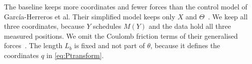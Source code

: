 The baseline keeps more coordinates and fewer forces than the control model
of Garc\'ia-Herreros et al.
Their simplified model keeps only $X$ and
$\Theta$~\cite[Eq.~(11)]{garcia2013model}.
We keep all three coordinates, because $Y$ schedules $M(Y)$ and the data
hold all three measured positions.
We omit the Coulomb friction terms of their generalised
forces~\cite[Eq.~(6)]{garcia2013model}.
The length $L_b$ is fixed and not part of $\theta$, because it defines the
coordinates $q$ in \eqref{eq:Ptransform}.

